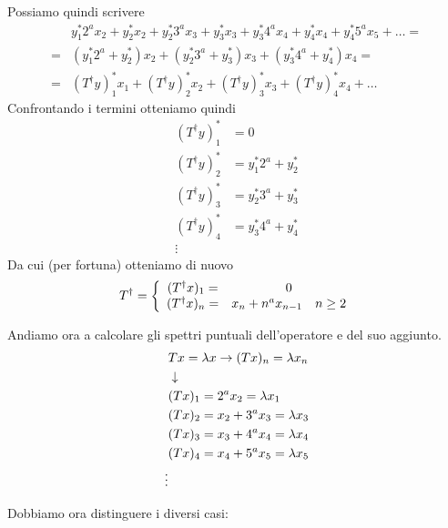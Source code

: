 Possiamo quindi scrivere
\begin{align}
	&y_1^* 2^a x_2 + y_2^* x_2 + y_2^* 3^a x_3 + y_3^* x_3 + y_3^* 4^a x_4  + y_4^* x_4 + y_4^* 5^a x_5 + \dots = \nonumber \\
	=& (y_1^* 2^a + y_2^*)x_2 + (y_2^* 3^a + y_3^*) x_3 + (y_3^* 4^a + y_4^*) x_4 =  \\
	=&(T^\dagger y)_1^* x_1 + (T^\dagger y)_2^* x_2 + (T^\dagger y)_3^* x_3 + (T^\dagger y)_4^* x_4 + \dots
\end{align}
Confrontando i termini otteniamo quindi
\begin{align}
	(T^\dagger y)_1^* &= 0\\
	(T^\dagger y)_2^* &= y_1^* 2^a + y_2^*\\
	(T^\dagger y)_3^* &= y_2^* 3^a + y_3^*\\
	(T^\dagger y)_4^* &=y_3^* 4^a + y_4^*\\
	\vdots \nonumber
\end{align}
Da cui (per fortuna) otteniamo di nuovo
\begin{align}
	 T^\dagger = \left\{ \begin{array}{cc} (T^\dagger x)_1 =& 0\\ (T^\dagger x)_n =& x_n + n^a x_{n-1} \quad n \geq 2 \end{array} \right.
\end{align}

Andiamo ora a calcolare gli spettri puntuali dell'operatore e del suo aggiunto.
\begin{align}
	&Tx = \lambda x \to (Tx)_n = \lambda x_n\\ &\downarrow \nonumber \\
	&(Tx)_1 = 2^a x_2 = \lambda x_1\\
	&(Tx)_2 = x_2 + 3^a x_3 = \lambda x_3\\
	&(Tx)_3 = x_3 + 4^a x_4 = \lambda x_4\\
	&(Tx)_4 = x_4 + 5^a x_5 = \lambda x_5\\
	\vdots \nonumber
\end{align}

Dobbiamo ora distinguere i diversi casi: 

